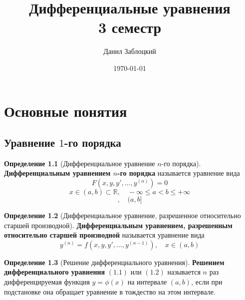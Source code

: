 \documentclass{report}
\title{Дифференциальные уравнения \\ 3 семестр}
\author{Данил Заблоцкий}
\date{\today}
\theoremstyle{definition}
\newtheorem{definition}{Определение}[section]
\begin{document}
\maketitle
\tableofcontents

\chapter{Основные понятия}

\section{Уравнение $1$-го порядка}

\begin{definition}[Дифференциальное уравнение $n$-го порядка]
    \textbf{Дифференциальным уравнением $n$-го порядка} называется уравнение вида
    \begin{equation}
        F(x,y,y',\ldots,y^{(n)}) = 0
    \end{equation}
    \begin{equation*}
        x \in (a,b) \subset \mathbb{R}, \quad -\infty \leqslant a < b \leqslant +\infty
    \end{equation*}
    \begin{equation*}
        [a,b), \quad [a,b], \quad (a,b]
    \end{equation*}
\end{definition}

\begin{definition}[Дифференциальное уравнение, разрешенное относительно старшей производной]
    \textbf{Дифференциальным уравнением, разрешенным относительно старшей производной} называется уравнение вида
    \begin{equation}
        y^{(n)} = f(x,y,y',\ldots,y^{(n-1)}), \quad x \in (a,b)
    \end{equation}
\end{definition}

\begin{definition}[Решение дифференциального уравнения]
    \textbf{Решением дифференциального уравнения} $(1.1)$ или $(1.2)$ называется $n$ раз дифференцируемая функция $y = \phi(x)$ на интервале $(a,b)$, если при подстановке она обращает уравнение в тождество на этом интервале.
\end{definition}
\end{document}
